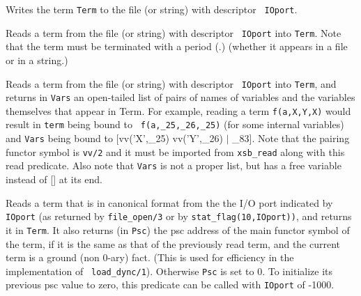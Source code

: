 {\begin{description}
    Writes the term {\tt Term} to the file (or string) with descriptor {\tt
    IOport}.

    Reads a term from the file (or string) with descriptor {\tt
    IOport} into {\tt Term}.  Note that the term must be terminated
    with a period (.) (whether it appears in a file or in a string.)

    Reads a term from the file (or string) with descriptor {\tt
    IOport} into {\tt Term}, and returns in {\tt Vars} an open-tailed list of
    pairs of names of variables and the variables themselves that
    appear in Term.  For example, reading a term {\tt f(a,X,Y,X)}
    would result in {\tt term} being bound to {\tt
    f(a,\_25,\_26,\_25)} (for some internal variables) and {\tt Vars}
    being bound to {[vv('X',\_25) vv('Y',\_26) $\mid$ \_83]}.  Note that the
    pairing functor symbol is {\tt vv/2} and it must be imported from
    {\tt xsb\_read} along with this read predicate.  Also note that 
    {\tt Vars} is not a proper list, but has a free variable instead 
    of [] at its end.

    Reads a term that is in canonical format from the the I/O port
    indicated by {\tt IOport} (as returned by {\tt file\_open/3} or
    by {\tt stat\_flag(10,IOport))}, and returns it in {\tt Term}.
    It also returns (in {\tt Psc}) the psc address of the main functor
    symbol of the term, if it is the same as that of the previously
    read term, and the current term is a ground (non 0-ary) fact.
    (This is used for efficiency in the implementation of {\tt
    load\_dync/1}).  Otherwise {\tt Psc} is set to 0.  To initialize
    its previous psc value to zero, this predicate can be called with
    {\tt IOport} of -1000.

%    

\end{description}

}

